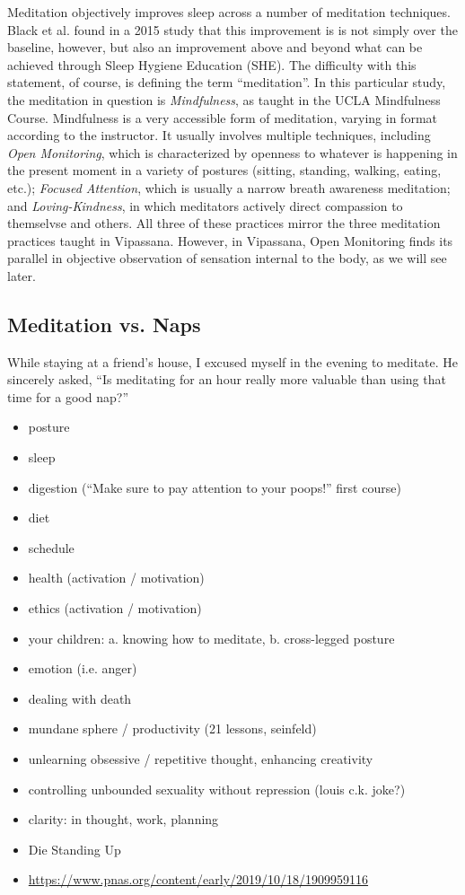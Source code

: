 \documentclass[a4paper, amsfonts, amssymb, amsmath, reprint, showkeys, nofootinbib, twoside]{revtex4-1}
\begin{document}
Meditation objectively improves sleep across a number of meditation techniques.
\cite{nagendra2012} Black et al. found in a 2015 study that this
improvement is is not simply over the baseline, however, but also an improvement
above and beyond what can be achieved through Sleep
Hygiene Education (SHE). \cite{black2015} The difficulty with this statement, of
course, is defining the term ``meditation''. In this particular study, the meditation
in question is \textit{Mindfulness}, as taught in the UCLA Mindfulness
Course. \cite{uclamaps} Mindfulness is a very accessible form of meditation, varying
in format according to the instructor. It usually involves multiple techniques,
including \textit{Open Monitoring}, which is characterized by
openness to whatever is happening in the present moment in a variety of postures
(sitting, standing, walking, eating, etc.); \textit{Focused Attention}, which is
usually a narrow breath awareness meditation; and \textit{Loving-Kindness}, in which
meditators actively direct compassion to themselvse and others. All three of these
practices mirror the three meditation practices taught in Vipassana. However, in Vipassana, Open
Monitoring finds its parallel in objective observation of sensation internal to the
body, as we will see later.


\subsection{Meditation vs. Naps}

While staying at a friend's house, I excused myself in the evening to meditate. He
sincerely asked, ``Is meditating for an hour really more valuable than using that
time for a good nap?''


\begin{itemize}
  \item posture
  \item sleep
  \item digestion (``Make sure to pay attention to your poops!'' first course)
  \item diet
  \item schedule
  \item health (activation / motivation)
  \item ethics (activation / motivation)
  \item your children: a. knowing how to meditate, b. cross-legged posture
  \item emotion (i.e. anger)
  \item dealing with death
  \item mundane sphere / productivity (21 lessons, seinfeld)
  \item unlearning obsessive / repetitive thought, enhancing creativity
  \item controlling unbounded sexuality without repression (louis c.k. joke?)
  \item clarity: in thought, work, planning
  \item Die Standing Up
  \item \url{https://www.pnas.org/content/early/2019/10/18/1909959116}
\end{itemize}
\end{document}
